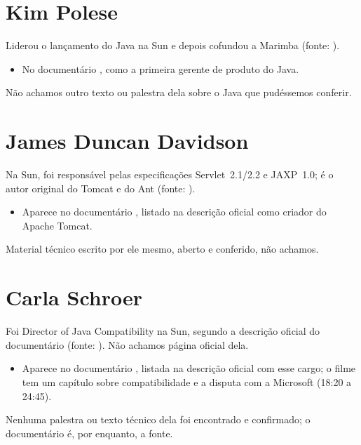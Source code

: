 \section{Kim Polese}
Liderou o lançamento do Java na Sun e depois cofundou a Marimba (fonte:
).

\begin{itemize}
\item No documentário , como a primeira gerente
  de produto do Java.
\end{itemize}
Não achamos outro texto ou palestra dela sobre o Java que pudéssemos
conferir.

\section{James Duncan Davidson}
Na Sun, foi responsável pelas especificações Servlet~2.1/2.2 e JAXP~1.0; é
o autor original do Tomcat e do Ant (fonte: ).

\begin{itemize}
\item Aparece no documentário , listado na
  descrição oficial como criador do Apache Tomcat.
\end{itemize}
Material técnico escrito por ele mesmo, aberto e conferido, não achamos.

\section{Carla Schroer}
Foi Director of Java Compatibility na Sun, segundo a descrição oficial do
documentário (fonte: ). Não achamos página oficial dela.

\begin{itemize}
\item Aparece no documentário , listada na
  descrição oficial com esse cargo; o filme tem um capítulo sobre
  compatibilidade e a disputa com a Microsoft (18:20 a 24:45).
\end{itemize}
Nenhuma palestra ou texto técnico dela foi encontrado e confirmado; o
documentário é, por enquanto, a fonte.
